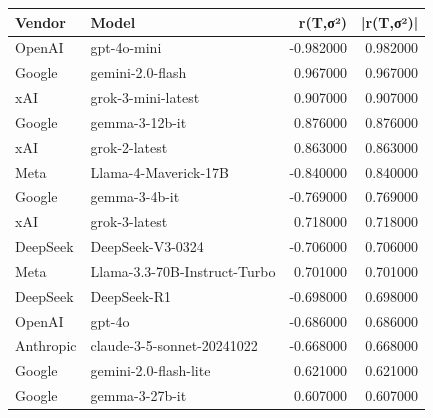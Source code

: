 \begin{tabular}{llrr}
\toprule
Vendor & Model & r(T,σ²) & |r(T,σ²)| \\
\midrule
OpenAI & gpt-4o-mini & -0.982000 & 0.982000 \\
Google & gemini-2.0-flash & 0.967000 & 0.967000 \\
xAI & grok-3-mini-latest & 0.907000 & 0.907000 \\
Google & gemma-3-12b-it & 0.876000 & 0.876000 \\
xAI & grok-2-latest & 0.863000 & 0.863000 \\
Meta & Llama-4-Maverick-17B & -0.840000 & 0.840000 \\
Google & gemma-3-4b-it & -0.769000 & 0.769000 \\
xAI & grok-3-latest & 0.718000 & 0.718000 \\
DeepSeek & DeepSeek-V3-0324 & -0.706000 & 0.706000 \\
Meta & Llama-3.3-70B-Instruct-Turbo & 0.701000 & 0.701000 \\
DeepSeek & DeepSeek-R1 & -0.698000 & 0.698000 \\
OpenAI & gpt-4o & -0.686000 & 0.686000 \\
Anthropic & claude-3-5-sonnet-20241022 & -0.668000 & 0.668000 \\
Google & gemini-2.0-flash-lite & 0.621000 & 0.621000 \\
Google & gemma-3-27b-it & 0.607000 & 0.607000 \\
\bottomrule
\end{tabular}
